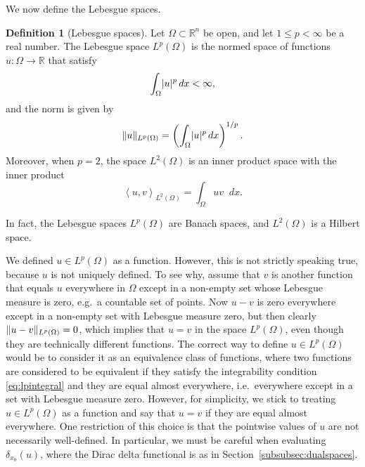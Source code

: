 \documentclass[english, 12pt, a4paper, sci, utf8, a-2b, online]{aaltothesis}
\theoremstyle{definition}
\newtheorem{definition}{Definition}[section]
\theoremstyle{plain}
\DeclarePairedDelimiter\abs{\lvert}{\rvert}
\DeclarePairedDelimiter\norm{\lVert}{\rVert}
\newcommand*{\innerprod}[2]{\left\langle #1, #2 \right\rangle}
\newcommand*\diff{\mathop{}\!d}
\numberwithin{equation}{section}
\begin{document}
We now define the Lebesgue spaces.
\begin{definition}[Lebesgue spaces]
    \label{def:lebesguespaces}
    Let $\Omega \subset \mathbb{R}^n$ be open,
    and let $1 \leq p < \infty$ be a real number.
    The Lebesgue space $L^p(\Omega)$ is the normed space of functions
    $u: \Omega \to \mathbb{R}$ that satisfy
    \begin{equation}
        \label{eq:lpintegral}
        \int_{\Omega} \abs{u}^p \diff x < \infty,
    \end{equation}
    and the norm is given by
    \begin{equation*}
        \norm{u}_{L^p(\Omega)}
        = \left( \int_{\Omega} \abs{u}^p \diff x \right)^{1/p}.
    \end{equation*}
    Moreover, when $p=2$, the space $L^2(\Omega)$ is an inner product space
    with the inner product
    \begin{equation*}
        \innerprod{u}{v}_{L^2(\Omega)} = \int_{\Omega} uv \diff x.
    \end{equation*}
\end{definition}
In fact, the Lebesgue spaces $L^p(\Omega)$ are Banach spaces,
and $L^2(\Omega)$ is a Hilbert space.

We defined $u \in L^p(\Omega)$ as a function.
However, this is not strictly speaking true, because $u$ is not uniquely defined.
To see why, assume that $v$ is another function that equals $u$ everywhere
in $\Omega$ except in a non-empty set whose Lebesgue measure is zero,
e.g.\ a countable set of points.
Now $u-v$ is zero everywhere except in a non-empty set with Lebesgue measure zero,
but then clearly $\norm{u-v}_{L^p(\Omega)} = 0$, which implies that $u=v$
in the space $L^p(\Omega)$, even though they are technically different functions.
The correct way to define $u \in L^p(\Omega)$ would be to consider it as
an equivalence class of functions, where two functions are considered to be
equivalent if they satisfy the integrability condition \eqref{eq:lpintegral}
and they are equal almost everywhere, i.e.\ everywhere except in a set
with Lebesgue measure zero. However, for simplicity, we stick to treating
$u \in L^p(\Omega)$ as a function and say that $u=v$ if they are equal almost 
everywhere. One restriction of this choice is that the pointwise values of $u$ are 
not necessarily well-defined.
In particular, we must be careful when evaluating $\delta_{x_0}(u)$,
where the Dirac delta functional is as in Section~\ref{subsubsec:dualspaces}.
\end{document}
